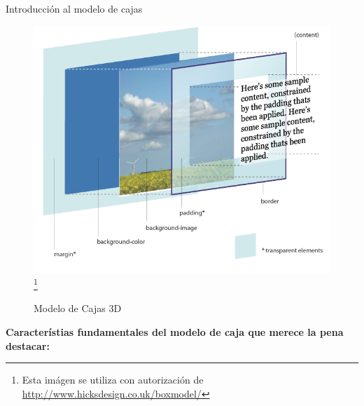 \begin{frame}{Introducción al modelo de cajas}
    \begin{figure}[H]
        \caption{Modelo de Cajas 3D}
        \label{fig:box2}
        \centering
        \includegraphics[scale=0.3]{imgs/boxmodel2.png}\footnote{Esta imágen se
        utiliza con autorización de \url{http://www.hicksdesign.co.uk/boxmodel/}}
    \end{figure}

    \textbf{ Característias fundamentales del modelo de caja que merece la pena
    destacar: }\\[0.5cm]


\end{frame}
